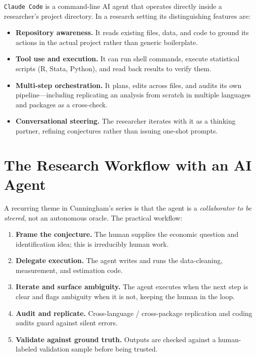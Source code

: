 \documentclass[11pt]{article}
\begin{document}
\texttt{Claude Code} is a command-line AI agent that operates directly inside a
researcher's project directory. In a research setting its distinguishing features are:

\begin{itemize}
  \item \textbf{Repository awareness.} It reads existing files, data, and code to
        ground its actions in the actual project rather than generic boilerplate.
  \item \textbf{Tool use and execution.} It can run shell commands, execute
        statistical scripts (R, Stata, Python), and read back results to verify them.
  \item \textbf{Multi-step orchestration.} It plans, edits across files, and audits
        its own pipeline---including replicating an analysis from scratch in multiple
        languages and packages as a cross-check.
  \item \textbf{Conversational steering.} The researcher iterates with it as a
        thinking partner, refining conjectures rather than issuing one-shot prompts.
\end{itemize}

\section{The Research Workflow with an AI Agent}

A recurring theme in Cunningham's series is that the agent is a \emph{collaborator
to be steered}, not an autonomous oracle. The practical workflow:

\begin{enumerate}[leftmargin=1.6em]
  \item \textbf{Frame the conjecture.} The human supplies the economic question and
        identification idea; this is irreducibly human work.
  \item \textbf{Delegate execution.} The agent writes and runs the data-cleaning,
        measurement, and estimation code.
  \item \textbf{Iterate and surface ambiguity.} The agent executes when the next step
        is clear and flags ambiguity when it is not, keeping the human in the loop.
  \item \textbf{Audit and replicate.} Cross-language / cross-package replication and
        coding audits guard against silent errors.
  \item \textbf{Validate against ground truth.} Outputs are checked against a
        human-labeled validation sample before being trusted.
\end{enumerate}
\end{document}

